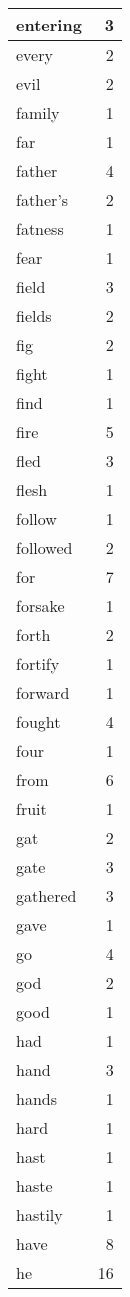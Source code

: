 \begin{center}
\begin{longtable}{l|r}
entering & 3\\ \hline 
every & 2\\ \hline 
evil & 2\\ \hline 
family & 1\\ \hline 
far & 1\\ \hline 
father & 4\\ \hline 
father's & 2\\ \hline 
fatness & 1\\ \hline 
fear & 1\\ \hline 
field & 3\\ \hline 
fields & 2\\ \hline 
fig & 2\\ \hline 
fight & 1\\ \hline 
find & 1\\ \hline 
fire & 5\\ \hline 
fled & 3\\ \hline 
flesh & 1\\ \hline 
follow & 1\\ \hline 
followed & 2\\ \hline 
for & 7\\ \hline 
forsake & 1\\ \hline 
forth & 2\\ \hline 
fortify & 1\\ \hline 
forward & 1\\ \hline 
fought & 4\\ \hline 
four & 1\\ \hline 
from & 6\\ \hline 
fruit & 1\\ \hline 
gat & 2\\ \hline 
gate & 3\\ \hline 
gathered & 3\\ \hline 
gave & 1\\ \hline 
go & 4\\ \hline 
god & 2\\ \hline 
good & 1\\ \hline 
had & 1\\ \hline 
hand & 3\\ \hline 
hands & 1\\ \hline 
hard & 1\\ \hline 
hast & 1\\ \hline 
haste & 1\\ \hline 
hastily & 1\\ \hline 
have & 8\\ \hline 
he & 16\\ \hline 

\end{longtable}
\end{center}
